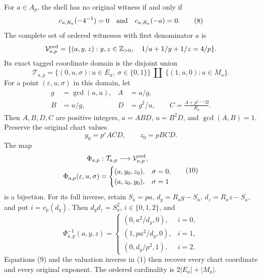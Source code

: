 \begin{theorem}
\label{thm:shellwise-no-hit}
For \(a\in A_p\), the shell has no original witness if and only if
\[
 c_{a,R_a}(-4^{-1})=0
 \quad\hbox{and}\quad
 c_{a,R_a}(-a)=0. \tag{8}
\]
The complete set of ordered witnesses with first denominator \(a\) is
\[
 \mathcal V_{a,p}^{\rm ord}
 =\{(a,y,z):y,z\in\mathbb Z_{>0},\quad 1/a+1/y+1/z=4/p\}.
\]
Its exact tagged coordinate domain is the disjoint union
\[
 \mathcal T_{a,p}
 =\{(0,u,\sigma):u\in E_a,\ \sigma\in\{0,1\}\}
 \ \coprod\ \{(1,u,0):u\in M_a\}.
\]
For a point \((\varepsilon,u,\sigma)\) in this domain, let
\[
 \begin{aligned}
 g&=\gcd(a,u),& A&=a/g,\\
 B&=u/g,&D&=g^2/u,\qquad
 C=\frac{A+p^{1-\varepsilon}B}{R_a}.
 \end{aligned}\tag{9}
\]
Then \(A,B,D,C\) are positive integers, \(a=ABD\), \(u=B^2D\),
and \(\gcd(A,B)=1\). Preserve the original chart values
\[
 y_0=p^\varepsilon ACD,\qquad z_0=pBCD.
\]
The map
\[
 \begin{gathered}
 \Phi_{a,p}:\mathcal T_{a,p}\longrightarrow\mathcal V_{a,p}^{\rm ord},\\
 \Phi_{a,p}(\varepsilon,u,\sigma)=
 \begin{cases}
  (a,y_0,z_0),&\sigma=0,\\
  (a,z_0,y_0),&\sigma=1
 \end{cases}
 \end{gathered} \tag{10}
\]
is a bijection. For its full inverse, retain
\(S_a=pa\), \(d_y=R_a y-S_a\), \(d_z=R_a z-S_a\), and put
\(i=v_p(d_y)\). Then \(d_y d_z=S_a^2\), \(i\in\{0,1,2\}\), and
\[
 \Phi_{a,p}^{-1}(a,y,z)=
 \begin{cases}
  (0,a^2/d_y,0),&i=0,\\
  (1,pa^2/d_y,0),&i=1,\\
  (0,d_y/p^2,1),&i=2.
 \end{cases} \tag{10a}
\]
Equations (9) and the valuation inverse in (1) then recover every
chart coordinate and every original exponent. The ordered cardinality is
\(2|E_a|+|M_a|\).


\end{theorem}
